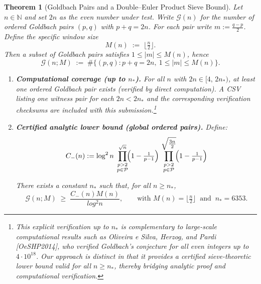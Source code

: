 \documentclass[11pt]{article}
\theoremstyle{inline}
\theoremstyle{break}
\theoremstyle{break}
\theoremstyle{break}
\newtheorem{theorem}{Theorem}
\theoremstyle{break}
\theoremstyle{break}
\theoremstyle{break}
\theoremstyle{break}
\theoremstyle{inline}
\newcommand{\xMertens}{6353} %
\newcommand{\CminusProduct}{C_{-}}
\begin{document}
\begin{theorem}[Goldbach Pairs and a Double–Euler Product Sieve Bound]
\label{thm:main}
Let \(n\in\mathbb{N}\) and set \(2n\) as the even number under test.
Write \(\mathcal{G}(n)\) for the number of \emph{ordered} Goldbach pairs \((p,q)\) with \(p+q=2n\).
For each pair write \(m := \tfrac{q-p}{2}\).
Define the specific window size
\begin{equation}
M(n) \;:=\; \bigl\lfloor \tfrac{n}{2} \bigr\rfloor .
\end{equation}
Then a subset of Goldbach pairs satisfies \(1 \le |m| \le M(n)\), hence
\begin{equation}
\mathcal{G}(n;M) \;:=\; \#\{(p,q): p+q=2n,\ 1\le |m| \le M(n)\}.
\end{equation}

\begin{enumerate}
   \item \textbf{Computational coverage (up to \(n_\ast\)).}
   For all \(n\) with \(2n \in [4,\,2n_\ast)\), at least one ordered Goldbach pair exists
   (verified by direct computation). A CSV listing one witness pair for each \(2n<2n_\ast\) and the
   corresponding verification checksums are included with this submission.\footnote{This explicit verification up to \( n_\ast \) is complementary to large-scale computational results such as Oliveira e Silva, Herzog, and Pardi [OeSHP2014], who verified Goldbach’s conjecture for all even integers up to \( 4\cdot 10^{18} \). Our approach is distinct in that it provides a certified sieve-theoretic lower bound valid for all \( n \ge n_\ast \), thereby bridging analytic proof and computational verification.}

  \item \textbf{Certified analytic lower bound (global ordered pairs).}
  Define:
  \begin{equation}
    \CminusProduct(n) := \log^2{n} \;
      \prod_{\substack{p>2\\ p\in\mathcal{P}}}^{\sqrt{n}}
        \!\Bigl(1-\tfrac{1}{p-1}\Bigr)\,
      \prod_{\substack{p>2\\ p\in\mathcal{P}}}^{\sqrt{\tfrac{3n}{2}}}
        \!\Bigl(1-\tfrac{1}{p-1}\Bigr)
     \label{eq:cminus-product-definition}
   \end{equation}

  There exists a constant \( n_\ast \) such that, for all \(n \ge n_\ast\),
  \begin{equation}
    \mathcal{G}(n;M)\;\ge\;\frac{\CminusProduct(n)M(n)}{log^2 n},
    \qquad
    \text{with } M(n)=\bigl\lfloor \tfrac{n}{2} \bigr\rfloor
    \ \text{ and }\
    n_\ast=\xMertens .
    \label{eq:analytic-lower-bound-global}
  \end{equation}
\end{enumerate}
\end{theorem}
\end{document}
